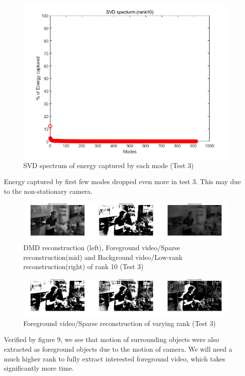 \documentclass[11pt,a4paper]{article}
\numberwithin{equation}{subsection}
\begin{document}
\begin{figure}[H]
\begin{center}
\includegraphics[scale=0.25]{t3f0.jpg}
\caption{SVD spectrum of energy captured by each mode (Test 3)}
\end{center}
\end{figure}
Energy captured by first few modes dropped even more in test 3. This may due to the non-stationary camera.

\begin{figure}[H]
\begin{center}
\includegraphics[scale=0.17]{t3f1.jpg}
\caption{DMD reconstruction (left), Foreground video/Sparse reconstruction(mid) and Background video/Low-rank reconstruction(right) of rank 10 (Test 3)}
\end{center}
\end{figure}

\begin{figure}[H]
\begin{center}
\includegraphics[scale=0.17]{t3f2.jpg}
\caption{Foreground video/Sparse reconstruction of varying rank (Test 3)}
\end{center}
\end{figure}
Verified by figure 9, we see that motion of surrounding objects were also extracted as foreground objects due to the motion of camera. We will need a much higher rank to fully extract interested foreground video, which takes significantly more time.
\end{document}
